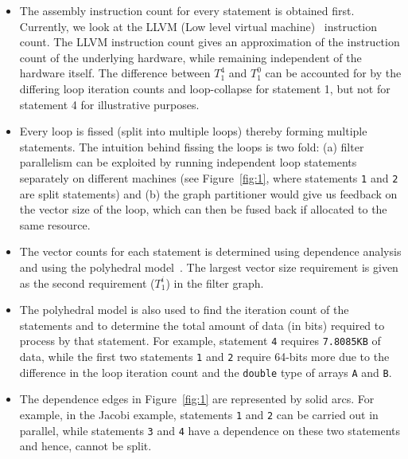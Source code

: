 \begin{itemize}

\item The assembly instruction count for every statement is obtained
  first. Currently, we look at the LLVM (Low level virtual
  machine)~\cite{clat04} instruction count. %
  The LLVM instruction count gives an approximation of the instruction
  count of the underlying hardware, while remaining independent of the
  hardware itself. The difference between $T^4_1$ and $T^0_1$ can be
  accounted for by the differing loop iteration counts and loop-collapse
  for statement 1, but not for statement 4 for illustrative purposes.

\item Every loop is fissed (split into multiple loops) thereby forming
  multiple statements. The intuition behind fissing the loops is two
  fold: (a) filter parallelism can be exploited by running independent
  loop statements separately on different machines (see
  Figure~\ref{fig:1}, where statements \texttt{1} and \texttt{2} are
  split statements) and (b) the graph partitioner would give us feedback
  on the vector size of the loop, which can then be fused back if
  allocated to the same resource.

\item The vector counts for each statement is determined using
  dependence analysis and using the polyhedral model~\cite{mgri98}. The
  largest vector size requirement is given as the second requirement
  ($T^i_1$) in the filter graph.

\item The polyhedral model is also used to find the iteration count of
  the statements and to determine the total amount of data (in bits)
  required to process by that statement. For example, statement
  \texttt{4} requires \texttt{7.8085KB} of data, while the first two
  statements \texttt{1} and \texttt{2} require 64-bits more due to the
  difference in the loop iteration count and the \texttt{double} type of
  arrays \texttt{A} and \texttt{B}. %

\item The dependence edges in Figure~\ref{fig:1} are represented by solid
arcs. For example, in the Jacobi example, statements \texttt{1} and
  \texttt{2} can be carried out in parallel, while statements
  \texttt{3} and \texttt{4} have a dependence on these two statements
  and hence, cannot be split.

\end{itemize}


